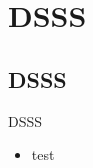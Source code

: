 \section{DSSS}
	\subsection{DSSS}
		\begin{frame}{DSSS}
			\begin{itemize}
				\item
				test
			\end{itemize}
		\end{frame}	